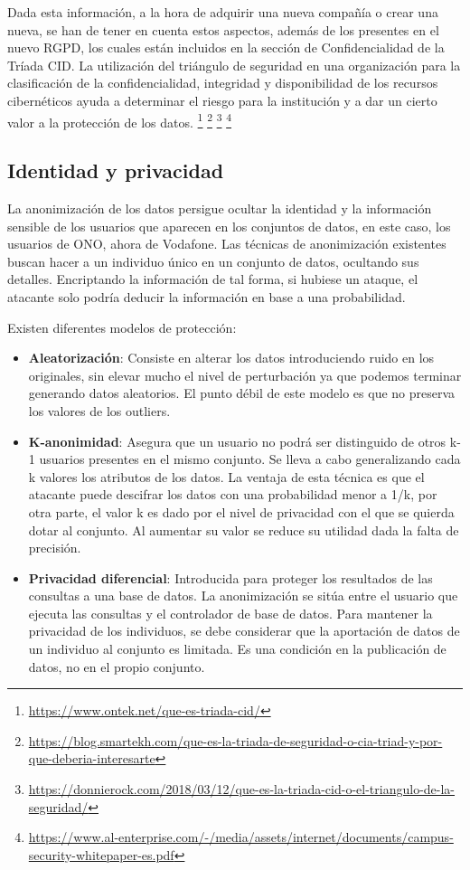 \documentclass{article}
\begin{document}
Dada esta información, a la hora de adquirir una nueva compañía o crear una nueva, se han de tener en cuenta estos aspectos, además de los presentes en el nuevo RGPD, los cuales están incluidos en la sección de Confidencialidad de la Tríada CID. La utilización del triángulo de seguridad en una organización para la clasificación de la confidencialidad, integridad y disponibilidad de los recursos cibernéticos ayuda a determinar el riesgo para la institución y a dar un cierto valor a la protección de los datos. \footnote{\url{https://www.ontek.net/que-es-triada-cid/}}
\footnote{\url{https://blog.smartekh.com/que-es-la-triada-de-seguridad-o-cia-triad-y-por-que-deberia-interesarte}}
\footnote{\url{https://donnierock.com/2018/03/12/que-es-la-triada-cid-o-el-triangulo-de-la-seguridad/}}
\footnote{\url{https://www.al-enterprise.com/-/media/assets/internet/documents/campus-security-whitepaper-es.pdf}}
\subsection{Identidad y privacidad}

La anonimización de los datos persigue ocultar la identidad y la información sensible de los usuarios que aparecen en los conjuntos de datos, en este caso, los usuarios de ONO, ahora de Vodafone. Las técnicas de anonimización existentes buscan hacer a un individuo único en un conjunto de datos, ocultando sus detalles. Encriptando la información de tal forma, si hubiese un ataque, el atacante solo podría deducir la información en base a una probabilidad.

Existen diferentes modelos de protección:
\begin{itemize}
	\item \textbf{Aleatorización}: Consiste en alterar los datos introduciendo ruido en los originales, sin elevar mucho el nivel de perturbación ya que podemos terminar generando datos aleatorios. El punto débil de este modelo es que no preserva los valores de los outliers.
	\item \textbf{K-anonimidad}: Asegura que un usuario no podrá ser distinguido de otros k-1 usuarios presentes en el mismo conjunto. Se lleva a cabo generalizando cada k valores los atributos de los datos. La ventaja de esta técnica es que el atacante puede descifrar los datos con una probabilidad menor a 1/k, por otra parte, el valor k es dado por el nivel de privacidad con el que se quierda dotar al conjunto. Al aumentar su valor se reduce su utilidad dada la falta de precisión.
	\item \textbf{Privacidad diferencial}: Introducida para proteger los resultados de las consultas a una base de datos. La anonimización se sitúa entre el usuario que ejecuta las consultas y el controlador de base de datos. Para mantener la privacidad de los individuos, se debe considerar que la aportación de datos de un individuo al conjunto es limitada. Es una condición en la publicación de datos, no en el propio conjunto.
\end{itemize}
\end{document}
